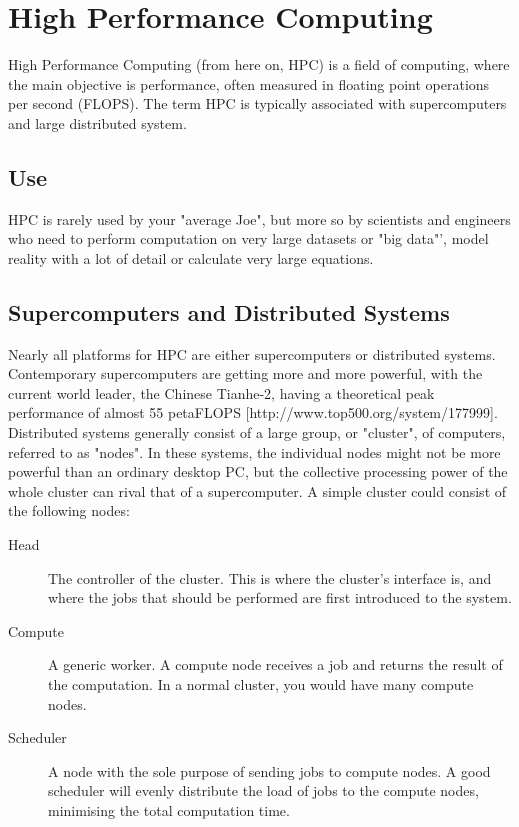 \section{High Performance Computing}
High Performance Computing (from here on, HPC) is a field of computing, where the main objective is performance, often measured in floating point operations per second (FLOPS). The term HPC is typically associated with supercomputers and large distributed system.

\subsection{Use}
HPC is rarely used by your "average Joe", but more so by scientists and engineers who need to perform computation on very large datasets or "big data"', model reality with a lot of detail or calculate very large equations.

\subsection{Supercomputers and Distributed Systems}
Nearly all platforms for HPC are either supercomputers or distributed systems. Contemporary supercomputers are getting more and more powerful, with the current world leader, the Chinese Tianhe-2, having a theoretical peak performance of almost 55 petaFLOPS [http://www.top500.org/system/177999].
Distributed systems generally consist of a large group, or "cluster", of computers, referred to as "nodes". In these systems, the individual nodes might not be more powerful than an ordinary desktop PC, but the collective processing power of the whole cluster can rival that of a supercomputer.
A simple cluster could consist of the following nodes:
\begin{description}
	\item [Head]
	The controller of the cluster. This is where the cluster's interface is, and where the jobs that should be performed are first introduced to the system.
	\item [Compute]
	A generic worker. A compute node receives a job and returns the result of the computation. In a normal cluster, you would have many compute nodes.
	\item [Scheduler]
	A node with the sole purpose of sending jobs to compute nodes. A good scheduler will evenly distribute the load of jobs to the compute nodes, minimising the total computation time.
\end{description}

